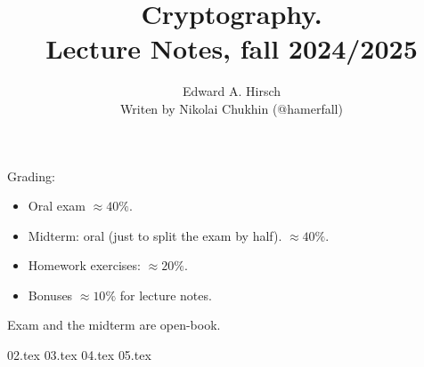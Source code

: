\documentclass[a4paper,14pt]{extarticle}
\theoremstyle{definition}
\numberwithin{equation}{section} %
\numberwithin{figure}{section} %
\numberwithin{table}{section} %
\begin{document}
    \title{Cryptography. \\ Lecture Notes, fall 2024/2025}
    \author{Edward A. Hirsch \\ Writen by Nikolai Chukhin (@hamerfall)}
    \date{}
    \maketitle
    \newpage

    \tableofcontents
    \newpage

    Grading:
    \begin{itemize}
        \item Oral exam $\approx 40\%$.
        \item Midterm: oral (just to split the exam by half). $\approx 40\%$.
        \item Homework exercises: $\approx 20\%$.
        \item Bonuses $\approx 10\%$ for lecture notes.
    \end{itemize}
    Exam and the midterm are open-book.

    {02.tex}
    {03.tex}
    {04.tex}
    {05.tex}
\end{document}
